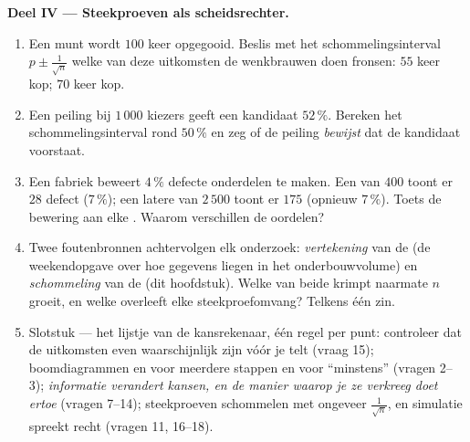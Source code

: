 \begin{problem}
\medskip
\noindent\textbf{Deel IV --- Steekproeven als scheidsrechter.}
\begin{enumerate}[resume]
  \item Een munt wordt $100$ keer opgegooid. Beslis met het
        schommelingsinterval $p \pm \frac{1}{\sqrt n}$ welke van deze
        uitkomsten de wenkbrauwen doen fronsen: $55$ keer kop; $70$ keer kop.
  \item Een peiling bij $1\,000$ kiezers geeft een kandidaat $52\,\%$.
        Bereken het schommelingsinterval rond $50\,\%$ en zeg of de peiling
        \emph{bewijst} dat de kandidaat voorstaat.
  \item Een fabriek beweert $4\,\%$ defecte onderdelen te maken. Een
         van $400$ toont er $28$ defect ($7\,\%$); een latere
         van $2\,500$ toont er $175$ (opnieuw $7\,\%$). Toets de
        bewering aan elke . Waarom verschillen de oordelen?
  \item Twee foutenbronnen achtervolgen elk onderzoek: \emph{vertekening}
        van de  (de weekendopgave over hoe gegevens liegen in het
        onderbouwvolume) en \emph{schommeling} van de  (dit
        hoofdstuk). Welke van beide krimpt naarmate $n$ groeit, en welke
        overleeft elke steekproefomvang? Telkens één zin.
  \item Slotstuk --- het lijstje van de kansrekenaar, één regel per punt:
        controleer dat de uitkomsten even waarschijnlijk zijn vóór je telt
        (vraag 15); boomdiagrammen en  voor meerdere stappen en
        voor ``minstens'' (vragen 2--3); \emph{informatie verandert kansen, en
        de manier waarop je ze verkreeg doet ertoe} (vragen 7--14);
        steekproeven schommelen met ongeveer $\frac{1}{\sqrt n}$, en simulatie
        spreekt recht (vragen 11, 16--18).
\end{enumerate}
\end{problem}
